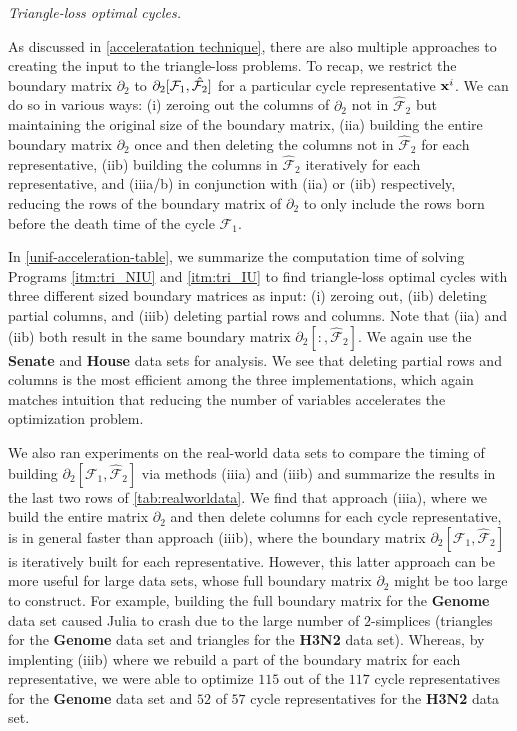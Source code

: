 \emph{Triangle-loss optimal cycles.}

As discussed in \se \ref{acceleratation technique}, there are also multiple approaches to creating the input to the triangle-loss problems. To recap, we restrict the boundary matrix $\partial_2$ to $\partial_{2}[\mathcal{F}_1, \hat {\mathcal{F}_2}]$ for a particular cycle representative $\mathbf{x}^i$. We can do so in various ways: (i) zeroing out the columns of $\partial_2$ not in $\hat{\mathcal{F}}_2$ but maintaining the original size of the boundary matrix, (iia) building the entire boundary matrix $\partial_2$ once and then deleting the columns not in $\hat{\mathcal{F}}_2$ for each representative, (iib) building the columns in $\hat{\mathcal{F}}_2$ iteratively for each representative, and (iiia/b) in conjunction with (iia) or (iib) respectively, reducing the rows of the boundary matrix of $\partial_2$ to only include the rows born before the death time of the cycle $\mathcal{F}_1$. 

In \tab \ref{unif-acceleration-table}, we summarize the computation time of solving Programs 
\ref{itm:tri_NIU} and
\ref{itm:tri_IU}
 to find triangle-loss optimal cycles with three different sized boundary matrices as input: (i) zeroing out, (iib) deleting partial columns, and (iiib) deleting partial rows and columns. Note that (iia) and (iib) both result in the same boundary matrix $\partial_2[:, \hat{\mathcal{F}}_2]$. We again use the \textbf{Senate} and \textbf{House} data sets for analysis. We see that deleting partial rows and columns is the most efficient among the three implementations, which again matches intuition that reducing the number of variables accelerates the optimization problem. 

We also ran experiments on the real-world data sets to compare the timing of building $\partial_{2}[ \mathcal{F}_1 , \hat {\mathcal{F}}_{2}]$ via methods (iiia) and (iiib) and summarize the results in the last two rows of \tab \ref{tab:realworldata}. We find that approach (iiia), where we build the entire matrix $\partial_2$ and then delete columns for each cycle representative, is in general faster than approach (iiib), where the boundary matrix $\partial_2[\mathcal{F}_1, \hat{\mathcal{F}}_2]$ is iteratively built for each representative. However, this latter approach can be more useful for large data sets, whose full boundary matrix $\partial_2$ might be too large to construct. For example, building the full boundary matrix for the \textbf{Genome} data set caused Julia to crash due to the large number  of $2$-simplices (\DIFdelbegin {}\DIFdelend \DIFaddbegin {}\DIFaddend triangles for the \textbf{Genome} data set and \DIFdelbegin {}\DIFdelend \DIFaddbegin {}\DIFaddend triangles for the \textbf{H3N2} data set). Whereas, by implenting (iiib) where we rebuild a part of the boundary matrix for each representative, we were able to optimize $115$ out of the $117$ cycle representatives for the \textbf{Genome} data set and $52$ of $57$ cycle representatives for the \textbf{H3N2} data set.

